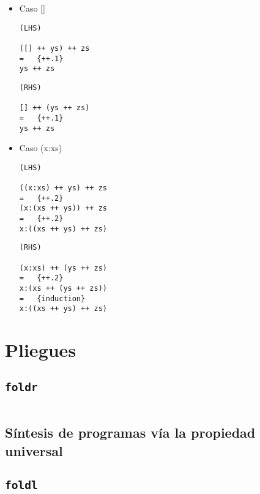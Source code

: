 
\begin{itemize}
\item Caso []
\begin{verbatim}
(LHS)

([] ++ ys) ++ zs
=   {++.1}
ys ++ zs
\end{verbatim}

\begin{verbatim}
(RHS)

[] ++ (ys ++ zs)
=   {++.1}
ys ++ zs
\end{verbatim}

\item Caso (x:xs)
\begin{verbatim}
(LHS)

((x:xs) ++ ys) ++ zs
=   {++.2}
(x:(xs ++ ys)) ++ zs
=   {++.2}
x:((xs ++ ys) ++ zs)
\end{verbatim}

\begin{verbatim}
(RHS)

(x:xs) ++ (ys ++ zs)
=   {++.2}
x:(xs ++ (ys ++ zs))
=   {induction}
x:((xs ++ ys) ++ zs)
\end{verbatim}

\end{itemize}

\section{Pliegues}

\subsection{\texttt{foldr}}
\inputminted{haskell}{definiciones/foldr.hs}

\subsection{Síntesis de programas vía la propiedad universal}


\subsection{\texttt{foldl}}
\inputminted{haskell}{definiciones/foldl.hs}



